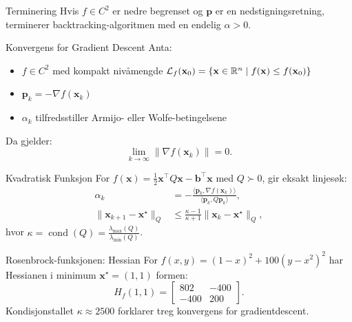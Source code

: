 \begin{lemma}{Terminering}{}
    Hvis \( f \in C^2 \) er nedre begrenset og \( \bm{p} \) er en nedstigningsretning, terminerer backtracking-algoritmen med en endelig \( \alpha > 0 \).
\end{lemma}

\begin{theorem}{Konvergens for Gradient Descent}{}
    Anta:
    \begin{itemize}
        \item \( f \in C^2 \) med kompakt nivåmengde \( \mathcal{L}_f(\mathbf{x}_0) = \{\mathbf{x} \in \mathbb{R}^n \mid f(\mathbf{x}) \leq f(\mathbf{x}_0)\} \)
        \item \( \bm{p}_k = -\nabla f(\bm{x}_k) \)
        \item \( \alpha_k \) tilfredsstiller Armijo- eller Wolfe-betingelsene
    \end{itemize}
    Da gjelder:
    \begin{equation}
        \lim_{k \to \infty} \|\nabla f(\bm{x}_k)\| = 0.
    \end{equation}
\end{theorem}

\begin{example}{Kvadratisk Funksjon}{}
    For \( f(\bm{x}) = \frac{1}{2} \bm{x}^\top Q \bm{x} - \bm{b}^\top \bm{x} \) med \( Q \succ 0 \), gir eksakt linjesøk:
    \begin{align*}
        \alpha_k                             & = -\frac{\langle \bm{p}_k, \nabla f(\bm{x}_k) \rangle}{\langle \bm{p}_k, Q \bm{p}_k \rangle}, \\
        \|\bm{x}_{k+1} - \bm{x}^\star\|_Q & \leq \frac{\kappa - 1}{\kappa + 1} \|\bm{x}_k - \bm{x}^\star\|_Q,
    \end{align*}
    hvor \( \kappa = \operatorname{cond}(Q) = \frac{\lambda_{\max}(Q)}{\lambda_{\min}(Q)} \).
\end{example}

\begin{example}{Rosenbrock-funksjonen: Hessian}{}
    For \( f(x,y) = (1 - x)^2 + 100(y - x^2)^2 \) har Hessianen i minimum \( \bm{x}^\star = (1,1) \) formen:
    \begin{equation}
        H_f(1,1) = \begin{bmatrix} 802 & -400 \\ -400 & 200 \end{bmatrix}.
    \end{equation}
    Kondisjonstallet \( \kappa \approx 2500 \) forklarer treg konvergens for gradientdescent.
\end{example}
